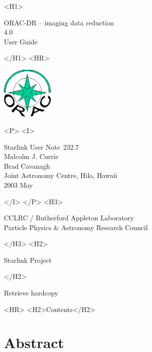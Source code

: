 \documentclass[twoside,11pt]{article}
\newcommand{\stardoccategory}  {Starlink User Note}
\newcommand{\stardocsource}    {sun\stardocnumber}
\newcommand{\stardocnumber}    {232.7}
\newcommand{\stardocauthors}   {Malcolm J. Currie\\
                               Brad Cavanagh\\
                               Joint Astronomy Centre, Hilo, Hawaii}
\newcommand{\stardocdate}      {2003 May}
\newcommand{\stardoctitle}     {ORAC-DR -- imaging data reduction}
\newcommand{\stardocversion}   {4.0}
\newcommand{\stardocmanual}    {User Guide}
\newcommand{\htmladdnormallink}[2]{#1}
\newcommand{\htmladdimg}[1]{}
\newcommand{\htmlref}[2]{#1}
\newcommand{\htmladdtonavigation}[1]{}
\newcommand{\xlabel}[1]{}
\renewcommand{\_}{\texttt{\symbol{95}}}
\begin{document}
\begin{htmlonly}
   \xlabel{}
   \begin{rawhtml} <H1> \end{rawhtml}
      \stardoctitle\\
      \stardocversion\\
      \stardocmanual
   \begin{rawhtml} </H1> <HR> \end{rawhtml}

\includegraphics[width=1.0in]{sun232_logo.eps}

   \begin{rawhtml} <P> <I> \end{rawhtml}
   \stardoccategory\ \stardocnumber \\
   \stardocauthors \\
   \stardocdate
   \begin{rawhtml} </I> </P> <H3> \end{rawhtml}
      \htmladdnormallink{CCLRC / Rutherford Appleton Laboratory}
                        {http://www.cclrc.ac.uk} \\
      \htmladdnormallink{Particle Physics \& Astronomy Research Council}
                        {http://www.pparc.ac.uk} \\
   \begin{rawhtml} </H3> <H2> \end{rawhtml}
      \htmladdnormallink{Starlink Project}{http://www.starlink.rl.ac.uk/}
   \begin{rawhtml} </H2> \end{rawhtml}
   \htmladdnormallink{\htmladdimg{source.gif} Retrieve hardcopy}
      {http://www.starlink.rl.ac.uk/cgi-bin/hcserver?\stardocsource}\\

  \label{stardoccontents}
  \begin{rawhtml} 
    <HR>
    <H2>Contents</H2>
  \end{rawhtml}
  \htmladdtonavigation{\htmlref{\htmladdimg{contents_motif.gif}}
        {stardoccontents}}

  \section{\xlabel{abstract}Abstract}
\end{htmlonly}
\end{document}
